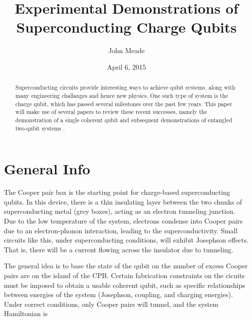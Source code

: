 \documentclass[12pt,letterpaper,notitlepage]{report}
\begin{document}
\title{Experimental Demonstrations of Superconducting Charge Qubits}
\author{John Meade}
\date{April 6, 2015}

\maketitle

\begin{abstract}
\doublespacing
\noindent
Superconducting circuits provide interesting ways to achieve qubit systems, along with many engineering challanges and hence new physics. One such type of system is the charge qubit, which has passed several milestones over the past few years. This paper will make use of several papers to review these recent successes, namely the demonstration of a single coherent qubit \cite{singleCooperPair} and subsequent demonstrations of entangled two-qubit systems \cite{twoPulseGates}\cite{onePulseGateNature}\cite{onePulseGatePhysica}.
\end{abstract}

\pagebreak
\doublespacing

%
%

\section*{General Info}

The Cooper pair box is the starting point for charge-based superconducting qubits. In this device, there is a thin insulating layer between the two chunks of superconducting metal (grey boxes), acting as an electron tunneling junction. Due to the low temperature of the system, electrons condense into Cooper pairs due to an electron-phonon interaction, leading to the superconductivity. Small circuits like this, under superconducting conditions, will exhibit Josephson effects. That is, there will be a current flowing across the insulator due to tunneling.

The general idea is to base the state of the qubit on the number of excess Cooper pairs are on the island of the CPB. Certain fabrication constraints on the cicuits must be imposed to obtain a usable coherent qubit, such as specific relationships between energies of the system (Josephson, coupling, and charging energies). Under correct conditions, only Cooper pairs will tunnel, and the system Hamiltonian is
\end{document}

